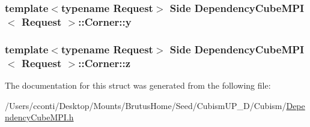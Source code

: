 \subsubsection[{y}]{\setlength{\rightskip}{0pt plus 5cm}template$<$typename Request$>$ Side {\bf Dependency\+Cube\+M\+P\+I}$<$ Request $>$\+::Corner\+::y}\label{struct_dependency_cube_m_p_i_1_1_corner_a76652bdcfac8ac1f4484bf56e1fe06ef}
\hypertarget{struct_dependency_cube_m_p_i_1_1_corner_aa9cfcf5cb03be02597c5d1d07fda5e97}{}
\subsubsection[{z}]{\setlength{\rightskip}{0pt plus 5cm}template$<$typename Request$>$ Side {\bf Dependency\+Cube\+M\+P\+I}$<$ Request $>$\+::Corner\+::z}\label{struct_dependency_cube_m_p_i_1_1_corner_aa9cfcf5cb03be02597c5d1d07fda5e97}


The documentation for this struct was generated from the following file\+:\begin{DoxyCompactItemize}
\item 
/\+Users/cconti/\+Desktop/\+Mounts/\+Brutus\+Home/\+Seed/\+Cubism\+U\+P\+\_\+D/\+Cubism/\hyperlink{_dependency_cube_m_p_i_8h}{Dependency\+Cube\+M\+P\+I.\+h}\end{DoxyCompactItemize}
